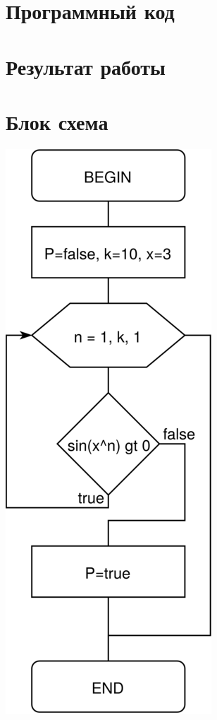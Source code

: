 \documentclass[a4paper,14pt,russian]{extreport}
\begin{document}
\section*{Программный код}




\section*{Результат работы}




\section*{Блок схема}

\includegraphics[scale=0.5]{result/scheme.png}
\end{document}
